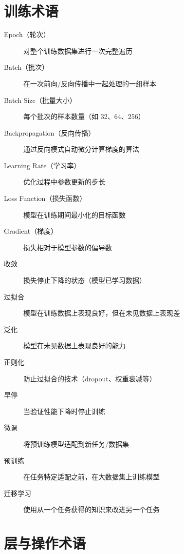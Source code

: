 \section{训练术语}

\begin{description}
    \item[Epoch（轮次）] 对整个训练数据集进行一次完整遍历
    \item[Batch（批次）] 在一次前向/反向传播中一起处理的一组样本
    \item[Batch Size（批量大小）] 每个批次的样本数量（如 32、64、256）
    \item[Backpropagation（反向传播）] 通过反向模式自动微分计算梯度的算法
    \item[Learning Rate（学习率）] 优化过程中参数更新的步长
    \item[Loss Function（损失函数）] 模型在训练期间最小化的目标函数
    \item[Gradient（梯度）] 损失相对于模型参数的偏导数
    \item[收敛] 损失停止下降的状态（模型已学习数据）
    \item[过拟合] 模型在训练数据上表现良好，但在未见数据上表现差
    \item[泛化] 模型在未见数据上表现良好的能力
    \item[正则化] 防止过拟合的技术（dropout、权重衰减等）
    \item[早停] 当验证性能下降时停止训练
    \item[微调] 将预训练模型适配到新任务/数据集
    \item[预训练] 在任务特定适配之前，在大数据集上训练模型
    \item[迁移学习] 使用从一个任务获得的知识来改进另一个任务
\end{description}

\section{层与操作术语}

